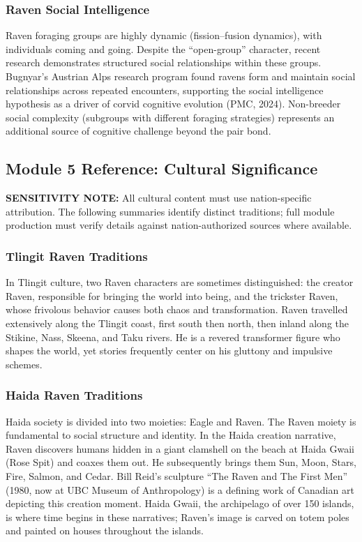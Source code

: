 \documentclass[11pt,letterpaper]{article}
\begin{document}
\subsubsection{Raven Social Intelligence}

Raven foraging groups are highly dynamic (fission--fusion dynamics), with individuals coming and going. Despite the ``open-group'' character, recent research demonstrates structured social relationships within these groups. Bugnyar's Austrian Alps research program found ravens form and maintain social relationships across repeated encounters, supporting the social intelligence hypothesis as a driver of corvid cognitive evolution (PMC, 2024). Non-breeder social complexity (subgroups with different foraging strategies) represents an additional source of cognitive challenge beyond the pair bond.

\subsection{Module 5 Reference: Cultural Significance}

\textbf{SENSITIVITY NOTE:} All cultural content must use nation-specific attribution. The following summaries identify distinct traditions; full module production must verify details against nation-authorized sources where available.

\subsubsection{Tlingit Raven Traditions}

In Tlingit culture, two Raven characters are sometimes distinguished: the creator Raven, responsible for bringing the world into being, and the trickster Raven, whose frivolous behavior causes both chaos and transformation. Raven travelled extensively along the Tlingit coast, first south then north, then inland along the Stikine, Nass, Skeena, and Taku rivers. He is a revered transformer figure who shapes the world, yet stories frequently center on his gluttony and impulsive schemes.

\subsubsection{Haida Raven Traditions}

Haida society is divided into two moieties: Eagle and Raven. The Raven moiety is fundamental to social structure and identity. In the Haida creation narrative, Raven discovers humans hidden in a giant clamshell on the beach at Haida Gwaii (Rose Spit) and coaxes them out. He subsequently brings them Sun, Moon, Stars, Fire, Salmon, and Cedar. Bill Reid's sculpture ``The Raven and The First Men'' (1980, now at UBC Museum of Anthropology) is a defining work of Canadian art depicting this creation moment. Haida Gwaii, the archipelago of over 150 islands, is where time begins in these narratives; Raven's image is carved on totem poles and painted on houses throughout the islands.
\end{document}
